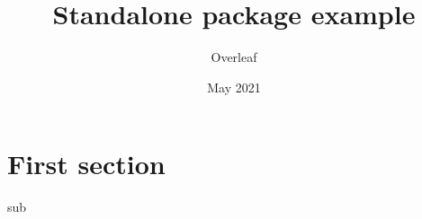 \documentclass{article}
\title{Standalone package example}
\author{Overleaf}
\date{May 2021}
\begin{document}
\maketitle

\section{First section}
{sub}
\end{document}
